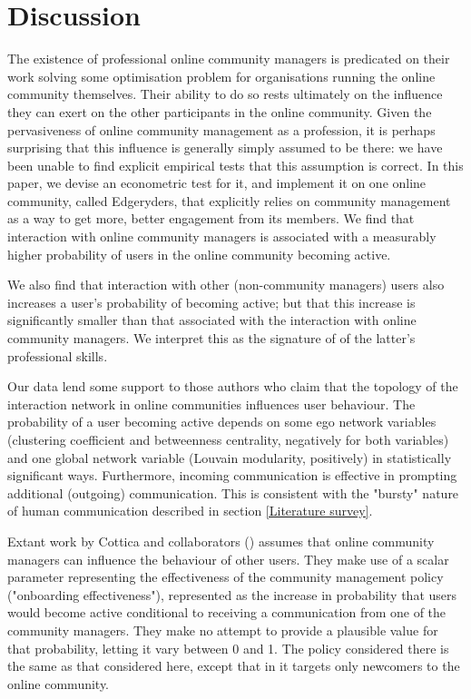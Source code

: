 \section{Discussion}

The existence of professional online community managers is predicated on their work solving some optimisation problem for organisations running the online community themselves. Their ability to do so rests ultimately on the influence they can exert on the other participants in the online community. Given the pervasiveness of online community management as a profession, it is perhaps surprising that this influence is generally simply assumed to be there: we have been unable to find explicit empirical tests that this assumption is correct. In this paper, we devise an econometric test for it, and implement it on one online community, called Edgeryders, that explicitly relies on community management as a way to get more, better engagement from its members. We find that interaction with online community managers is associated with a measurably higher probability of users in the online community becoming active. 

We also find that interaction with other (non-community managers) users also increases a user's probability of becoming active; but that this increase is significantly smaller than that associated with the interaction with online community managers. We interpret this as the signature of of the latter's professional skills. 

Our data lend some support to those authors who claim that the topology of the interaction network in online communities influences user behaviour. The probability of a user becoming active depends on some ego network variables (clustering coefficient and betweenness centrality, negatively for both variables) and one global network variable (Louvain modularity, positively) in statistically significant ways. Furthermore, incoming communication is effective in prompting additional (outgoing) communication. This is consistent with the "bursty" nature of human communication described in section \ref{Literature survey}.

Extant work by Cottica and collaborators (\cite{cottica2015online}) assumes that online community managers can influence the behaviour of other users. They make use of a scalar parameter representing the effectiveness of the community management policy ("onboarding effectiveness"), represented as the increase in probability that users would become active conditional to receiving a communication from one of the community managers. They make no attempt to provide a plausible value for that probability, letting it vary between 0 and 1. The policy considered there is the same as that considered here, except that in \cite{cottica2015online} it targets only newcomers to the online community. 

